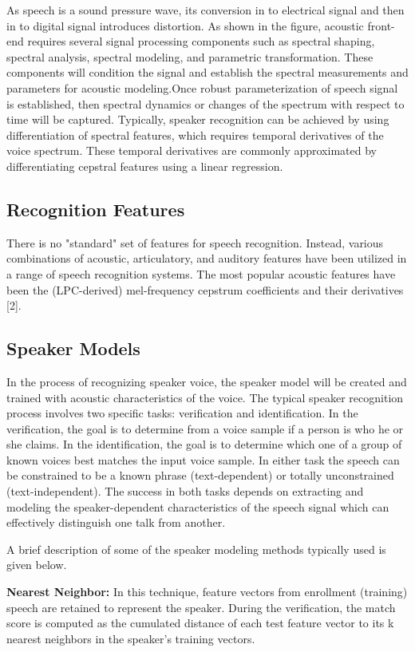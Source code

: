 \documentclass[sigconf]{acmart}
\begin{document}
As speech is a sound pressure wave, its conversion in to electrical signal and then in to digital signal introduces distortion. As shown in the figure, acoustic front-end requires several signal processing components such as spectral shaping, spectral analysis, spectral modeling, and parametric transformation. These components will condition the signal and establish the spectral measurements and parameters for acoustic modeling.Once robust parameterization of speech signal is established, then spectral dynamics or changes of the spectrum with respect to time will be captured. Typically, speaker recognition can be achieved by using differentiation of spectral features, which requires temporal derivatives of the voice spectrum. These temporal derivatives are commonly approximated by differentiating cepstral features using a linear regression.

\subsection{Recognition Features}
There is no "standard" set of features for speech recognition. Instead, various combinations of acoustic, articulatory, and auditory features have been utilized in a range of speech recognition systems. The most popular acoustic features have been the (LPC-derived) mel-frequency cepstrum coefficients and their derivatives [2].

\subsection{Speaker Models}
In the process of recognizing speaker voice, the speaker model will be created and trained with acoustic characteristics of the voice. The typical speaker recognition process involves two specific tasks: verification and identification. In the verification, the goal is to determine from a voice sample if a person is who he or she claims. In the identification, the goal is to determine which one of a group of known voices best matches the input voice sample. In either task the speech can be constrained to be a known phrase (text-dependent) or totally unconstrained (text-independent). The success in both tasks depends on extracting and modeling the speaker-dependent characteristics of the speech signal which can effectively distinguish one talk from another.

A brief description of some of the speaker modeling methods typically used is given below.

   \textbf{Nearest Neighbor:} In this technique, feature vectors from enrollment (training) speech 
are retained to represent the speaker. During the verification, the match score is computed as the cumulated distance of each test feature vector to its k nearest neighbors in the speaker's training vectors.
\end{document}
